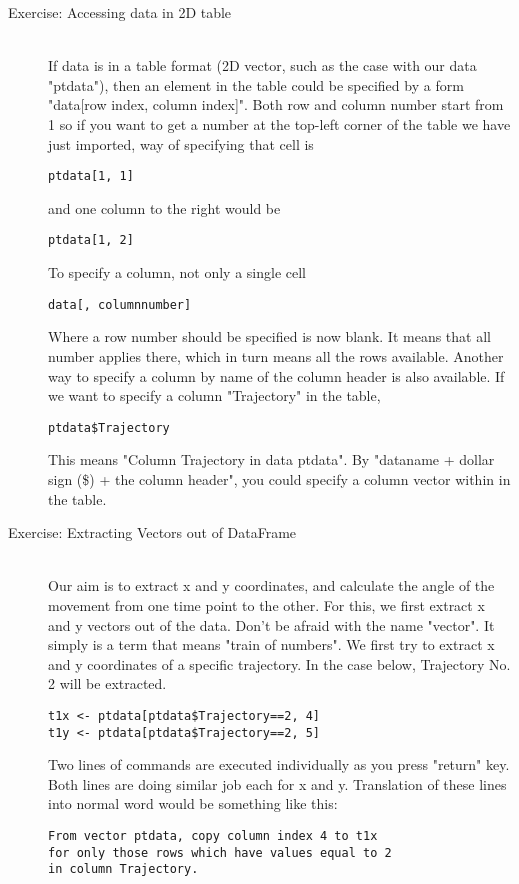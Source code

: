 \documentclass[11pnt]{article}
\begin{document}
\begin{description}
\item[Exercise: Accessing data in 2D table]\hfill\\

If data is in a table format (2D vector, such as the case with our data "ptdata"), then an element in the table could be specified by a form "data[row index, column index]". Both row and column number start from 1 so if you want to get a number at the top-left corner of the table we have just imported, way of specifying that cell is 

\verb"ptdata[1, 1]" 

and one column to the right would be 

\verb"ptdata[1, 2]"

To specify a column, not only a single cell
\begin{verbatim}
data[, columnnumber]
\end{verbatim}
Where a row number should be specified is now blank. It means that all number applies there, which in turn means all the rows available. Another way to specify a column by name of the column header is also available. If we want to specify a column "Trajectory" in the table, 
\begin{verbatim}
ptdata$Trajectory
\end{verbatim}
This means "Column Trajectory in data ptdata". By "dataname + dollar sign (\$) + the column header", you could specify a column vector within in the table.

\item[Exercise: Extracting Vectors out of DataFrame]\hfill\\

Our aim is to extract x and y coordinates, and calculate the angle of the movement from one time point to the other. For this, we first extract x and y vectors out of the data. Don't be afraid with the name "vector". It simply is a term that means "train of numbers". We first try to extract x and y coordinates of a specific trajectory. In the case below, Trajectory No. 2 will be extracted. 
\begin{verbatim}
t1x <- ptdata[ptdata$Trajectory==2, 4]
t1y <- ptdata[ptdata$Trajectory==2, 5]
\end{verbatim}
Two lines of commands are executed individually as you press "return" key. Both lines are doing similar job each for x and y. Translation of these lines into normal word would be something like this:

\verb"From vector ptdata, copy column index 4 to t1x"\\
\verb"for only those rows which have values equal to 2 "\\
\verb"in column Trajectory." 


\end{description}
\end{document}
